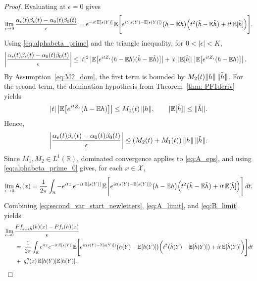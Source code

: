 \documentclass[12pt,leqno]{amsart}
\begin{document}
\begin{proof}
Evaluating at $\epsilon=0$ gives
\begin{align}\label{eq:alphabeta_prime_0}
\lim_{\epsilon\to 0}\frac{\alpha_\epsilon(t)\beta_\epsilon(t)-\alpha_0(t)\beta_0(t)}{\epsilon}
=
e^{-it\,\mathbb E[s(Y)]}\,
\mathbb E\Bigg[
e^{it(s(Y)-\mathbb E[s(Y)])}\big(h-\mathbb E h\big)\Big(t^2\big(\Tilde h-\mathbb E\Tilde h\big)+it\,\mathbb E[\Tilde h]\Big)
\Bigg].
\end{align}
Using \eqref{eq:alphabeta_prime} and the triangle inequality, for $0<|\epsilon|<K$,
\begin{align*}
\left|\frac{\alpha_\epsilon(t)\beta_\epsilon(t)-\alpha_0(t)\beta_0(t)}{\epsilon}\right|
&\le
|t|^2\left|\mathbb E\!\left[e^{itZ_\epsilon}(h-\mathbb Eh)(\Tilde h-\mathbb E\Tilde h)\right]\right|
+|t|\,|\mathbb E[\Tilde h]|\left|\mathbb E\!\left[e^{itZ_\epsilon}(h-\mathbb Eh)\right]\right|.
\end{align*}
By Assumption~\eqref{eq:M2_dom}, the first term is bounded by $M_2(t)\|h\|\,\|\Tilde h\|$.
For the second term, the domination hypothesis from Theorem~\ref{thm: PF1deriv} yields
\[
|t|\left|\mathbb E\!\left[e^{itZ_\epsilon}(h-\mathbb Eh)\right]\right|
\le M_1(t)\,\|h\|,
\qquad
|\mathbb E[\Tilde h]|\le \|\Tilde h\|.
\]
Hence,
\[
\left|\frac{\alpha_\epsilon(t)\beta_\epsilon(t)-\alpha_0(t)\beta_0(t)}{\epsilon}\right|
\le (M_2(t)+M_1(t))\,\|h\|\,\|\Tilde h\|.
\]
Since $M_1,M_2\in L^1(\mathbb R)$, dominated convergence applies to \eqref{eq:A_eps}, and using \eqref{eq:alphabeta_prime_0} gives,
for each $x\in\mathcal{X}$,
\begin{align}\label{eq:A_limit}
\lim_{\epsilon\to 0}\mathsf{A}_\epsilon(x)
=
\frac{1}{2\pi}\int_{\mathbb R}-e^{itx}\,e^{-it\,\mathbb E[s(Y)]}\,
\mathbb E\Bigg[
e^{it(s(Y)-\mathbb E[s(Y)])}\big(h-\mathbb E h\big)\Big(t^2\big(\Tilde h-\mathbb E\Tilde h\big)+it\,\mathbb E[\Tilde h]\Big)
\Bigg]\,dt.
\end{align}
Combining \eqref{eq:second_var_start_newletters}, \eqref{eq:A_limit}, and \eqref{eq:B_limit} yields
\begin{align*}
&\lim_{\epsilon\to 0}\frac{Pf_{s+\epsilon\Tilde h}(h)(x)-Pf_s(h)(x)}{\epsilon}
\\
&\quad\quad =\;\frac{1}{2\pi}\int_{\mathbb R} e^{itx} e^{-it\,\mathbb E [s(Y)] }\mathbb E\Bigg[ e^{it(s(Y)-\mathbb E [s(Y)])}
\big(h(Y)-\mathbb E[h(Y)]\big)\bigg(t^2\big(\Tilde{h}(Y)-\mathbb E[\Tilde{h}(Y)]\big)+it\,\mathbb E[\Tilde{h}(Y)]\bigg)\Bigg]dt\\
&\quad\quad+\;g_s''(x)\,\mathbb E [h(Y)] \mathbb E [\Tilde{h}(Y)].
\end{align*}

\end{proof}
\end{document}
